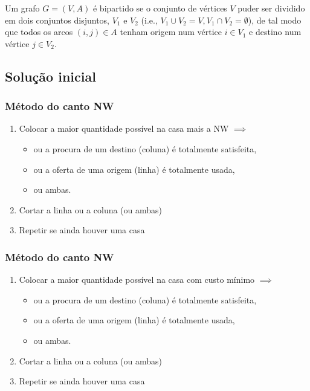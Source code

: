 \documentclass[10pt, a4paper]{article}
\begin{document}
\begin{multicols}{2}
Um grafo \(G = (V, A)\) é bipartido se o conjunto de vértices \(V\) puder ser dividido em dois conjuntos disjuntos, \(V_1\) e \(V_2\) (i.e., \(V_1 \cup V_2 = V, V_1 \cap V_2 = \emptyset\)), de tal modo que todos os arcos \((i,j) \in A\) tenham origem num vértice \(i \in V_1\) e destino num vértice \(j \in V_2\).

%

\subsection{Solução inicial}

\subsubsection{Método do canto NW}

\begin{enumerate}
    \item Colocar a maior quantidade possível na casa mais a NW \(\implies\)
    \begin{itemize}
        \item ou a procura de um destino (coluna) é totalmente satisfeita,
        \item ou a oferta de uma origem (linha) é totalmente usada,
        \item ou ambas.
    \end{itemize}
    \item Cortar a linha ou a coluna (ou ambas)
    \item Repetir se ainda houver uma casa
\end{enumerate}

\subsubsection{Método do canto NW}

\begin{enumerate}
    \item Colocar a maior quantidade possível na casa com custo mínimo \(\implies\)
    \begin{itemize}
        \item ou a procura de um destino (coluna) é totalmente satisfeita,
        \item ou a oferta de uma origem (linha) é totalmente usada,
        \item ou ambas.
    \end{itemize}
    \item Cortar a linha ou a coluna (ou ambas)
    \item Repetir se ainda houver uma casa
\end{enumerate}


\end{multicols}
\end{document}

